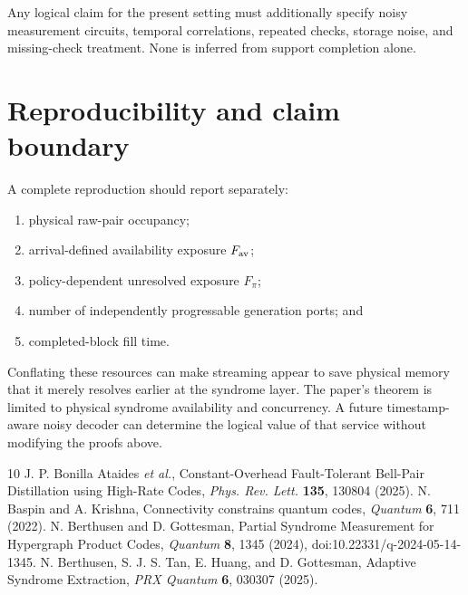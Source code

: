 \documentclass[aps,prx,preprint,superscriptaddress,nofootinbib,longbibliography]{revtex4-2}
\begin{document}
Any logical claim for the present setting must additionally specify noisy measurement circuits, temporal correlations, repeated checks, storage noise, and missing-check treatment. None is inferred from support completion alone.

\section{Reproducibility and claim boundary}
A complete reproduction should report separately:
\begin{enumerate}
\item physical raw-pair occupancy;
\item arrival-defined availability exposure $F_{\rm av}$;
\item policy-dependent unresolved exposure $F_\pi$;
\item number of independently progressable generation ports; and
\item completed-block fill time.
\end{enumerate}
Conflating these resources can make streaming appear to save physical memory that it merely resolves earlier at the syndrome layer. The paper's theorem is limited to physical syndrome availability and concurrency. A future timestamp-aware noisy decoder can determine the logical value of that service without modifying the proofs above.

\begin{thebibliography}{10}
 J. P. Bonilla Ataides \emph{et al.}, Constant-Overhead Fault-Tolerant Bell-Pair Distillation using High-Rate Codes, \emph{Phys. Rev. Lett.} \textbf{135}, 130804 (2025).
 N. Baspin and A. Krishna, Connectivity constrains quantum codes, \emph{Quantum} \textbf{6}, 711 (2022).
 N. Berthusen and D. Gottesman, Partial Syndrome Measurement for Hypergraph Product Codes, \emph{Quantum} \textbf{8}, 1345 (2024), doi:10.22331/q-2024-05-14-1345.
 N. Berthusen, S. J. S. Tan, E. Huang, and D. Gottesman, Adaptive Syndrome Extraction, \emph{PRX Quantum} \textbf{6}, 030307 (2025).
\end{thebibliography}
\end{document}

